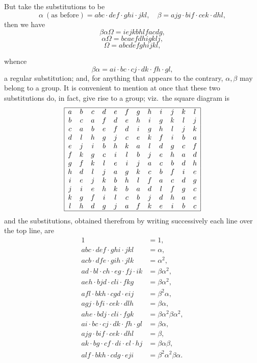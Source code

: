 \documentclass[11pt,a4paper]{article}
\begin{document}
\medskip

But take the substitutions to be
\[
\alpha\ (\text{as before}) = abc\cdot def\cdot ghi\cdot jkl,\quad \beta = ajg\cdot bif\cdot cek\cdot dhl,
\]
then we have
\[
\beta\alpha\Omega = iejkbhlfacdg,
\]
\[
\alpha\Omega = bcaefdhigklj,
\]
\[
\Omega = abcdefghijkl,
\]

\newpage


whence
\[
\beta\alpha = ai\cdot bc\cdot cj\cdot dk\cdot fh\cdot gl,
\]
a regular substitution; and, for anything that appears to the contrary, $\alpha, \beta$ may belong to a group. It is convenient to mention at once that these two substitutions do, in fact, give rise to a group; viz.\ the square diagram is
\[
\begin{array}{|cccccccccccc|}
\hline
a & b & c & d & e & f & g & h & i & j & k & l \\
b & c & a & f & d & e & h & i & g & k & l & j \\
c & a & b & e & f & d & i & g & h & l & j & k \\
d & l & h & g & j & c & e & k & f & i & b & a \\
e & j & i & b & h & k & a & l & d & g & c & f \\
f & k & g & c & i & l & b & j & e & h & a & d \\
g & f & k & l & e & i & j & a & c & b & d & h \\
h & d & l & j & a & g & k & c & b & f & i & e \\
i & e & j & k & b & h & l & f & a & c & d & g \\
j & i & e & h & k & b & a & d & l & f & g & c \\
k & g & f & i & l & c & b & j & d & h & a & e \\
l & h & d & g & j & a & f & k & e & i & b & c \\
\hline
\end{array}
\]
and the substitutions, obtained therefrom by writing successively each line over the top line, are
\begin{align*}
1 &= 1,\\
abc\cdot def\cdot ghi\cdot jkl &= \alpha,\\
acb\cdot dfe\cdot gih\cdot jlk &= \alpha^{2},\\
ad\cdot bl\cdot ch\cdot eg\cdot fj\cdot ik &= \beta\alpha^{2},\\
aeh\cdot bjd\cdot cli\cdot fkg &= \beta\alpha^{2},\\
afl\cdot bkh\cdot cgd\cdot eij &= \beta^{2}\alpha,\\
agj\cdot bfi\cdot cek\cdot dlh &= \beta\alpha,\\
ahe\cdot bdj\cdot cli\cdot fgk &= \beta\alpha^{2}\beta\alpha^{2},\\
ai\cdot bc\cdot cj\cdot dk\cdot fh\cdot gl &= \beta\alpha,\\
ajg\cdot bif\cdot cek\cdot dhl &= \beta,\\
ak\cdot bg\cdot cf\cdot di\cdot el\cdot hj &= \beta\alpha\beta,\\
alf\cdot bkh\cdot cdg\cdot eji &= \beta^{2}\alpha^{2}\beta\alpha.
\end{align*}
\end{document}
